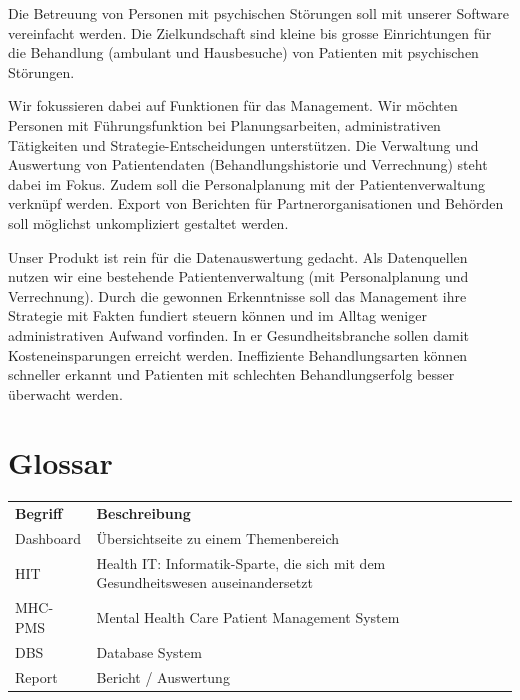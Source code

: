 \documentclass[a4paper]{scrreprt}
\begin{document}
Die Betreuung von Personen mit psychischen Störungen soll mit unserer Software vereinfacht werden. Die Zielkundschaft sind kleine bis grosse Einrichtungen für die Behandlung (ambulant und Hausbesuche) von Patienten mit psychischen Störungen.

Wir fokussieren dabei auf Funktionen für das Management. Wir möchten Personen mit Führungsfunktion bei Planungsarbeiten, administrativen Tätigkeiten und Strategie-Entscheidungen unterstützen. Die Verwaltung und Auswertung von Patientendaten (Behandlungshistorie und Verrechnung) steht dabei im Fokus. Zudem soll die Personalplanung mit der Patientenverwaltung verknüpf werden. Export von Berichten für Partnerorganisationen und Behörden soll möglichst unkompliziert gestaltet werden.

\bigskip

Unser Produkt ist rein für die Datenauswertung gedacht. Als Datenquellen nutzen wir eine bestehende Patientenverwaltung (mit Personalplanung und Verrechnung). Durch die gewonnen Erkenntnisse soll das Management ihre Strategie mit Fakten fundiert steuern können und im Alltag weniger administrativen Aufwand vorfinden. In er Gesundheitsbranche sollen damit Kosteneinsparungen erreicht werden. Ineffiziente Behandlungsarten können schneller erkannt und Patienten mit schlechten Behandlungserfolg besser überwacht werden.



\chapter{Glossar}
\begin{table}[h]
\label{tab_glossar}
\begin{tabular}{llll}
{\bf Begriff} 		& {\bf Beschreibung} \\
Dashboard			& Übersichtseite zu einem Themenbereich \\

HIT 				& Health IT: Informatik-Sparte, die sich mit dem Gesundheitswesen auseinandersetzt \\

MHC-PMS 			& Mental Health Care Patient Management System \\
DBS 				& Database System \\
Report				& Bericht / Auswertung


\end{tabular}
\end{table}
\end{document}
